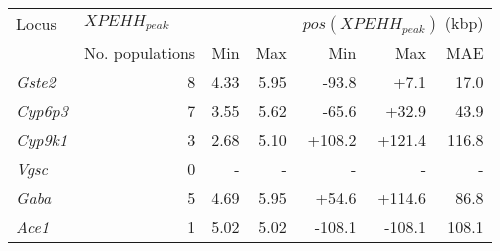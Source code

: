 \begin{tabular}{lrrrrrr}
\toprule
           Locus & \multicolumn{3}{l}{$XPEHH_{peak}$} & \multicolumn{3}{l}{$pos(XPEHH_{peak})$ (kbp)} \\
                 & No. populations &  Min &  Max &                       Min &    Max &   MAE \\
\midrule
  \textit{Gste2} &               8 & 4.33 & 5.95 &                     -93.8 &   +7.1 &  17.0 \\
 \textit{Cyp6p3} &               7 & 3.55 & 5.62 &                     -65.6 &  +32.9 &  43.9 \\
 \textit{Cyp9k1} &               3 & 2.68 & 5.10 &                    +108.2 & +121.4 & 116.8 \\
   \textit{Vgsc} &               0 &    - &    - &                         - &      - &     - \\
   \textit{Gaba} &               5 & 4.69 & 5.95 &                     +54.6 & +114.6 &  86.8 \\
   \textit{Ace1} &               1 & 5.02 & 5.02 &                    -108.1 & -108.1 & 108.1 \\
\bottomrule
\end{tabular}
